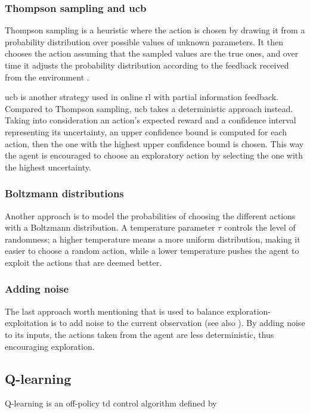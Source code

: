 \subsubsection{Thompson sampling and \acrfull{ucb}}
Thompson sampling is a heuristic where the action is chosen by drawing it from a probability distribution over possible values of unknown parameters. It then chooses the action assuming that the sampled values are the true ones, and over time it adjusts the probability distribution according to the feedback received from the environment \cite{thompson}.

\acrshort{ucb} is another strategy used in online \acrshort{rl} with partial information feedback. Compared to Thompson sampling, \acrshort{ucb} takes a deterministic approach instead. Taking into consideration an action's expected reward and a confidence interval representing its uncertainty, an upper confidence bound is computed for each action, then the one with the highest upper confidence bound is chosen. This way the agent is encouraged to choose an exploratory action by selecting the one with the highest uncertainty.

\subsubsection{Boltzmann distributions}
Another approach is to model the probabilities of choosing the different actions with a Boltzmann distribution. A temperature parameter $\tau$ controls the level of randomness; a higher temperature means a more uniform distribution, making it easier to choose a random action, while a lower temperature pushes the agent to exploit the actions that are deemed better.

\subsubsection{Adding noise}
The last approach worth mentioning that is used to balance exploration-exploitation is to add noise to the current observation (see also ). By adding noise to its inputs, the actions taken from the agent are less deterministic, thus encouraging exploration.


\subsection{Q-learning}
Q-learning is an off-policy \acrshort{td} control algorithm defined by \cite{qlearning}

